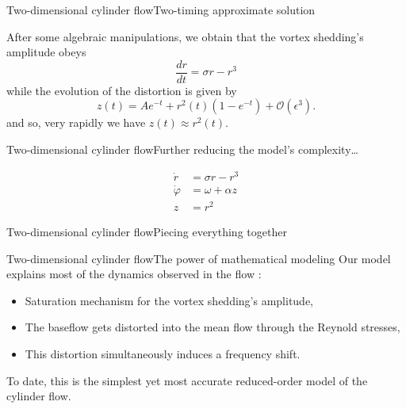 \documentclass[usenames,dvipsnames,svgnames,10pt,aspectratio=169]{beamer}
\begin{document}
\begin{frame}[t, c]{Two-dimensional cylinder flow}{Two-timing approximate solution}
  \begin{minipage}{.68\textwidth}
    After some algebraic manipulations, we obtain that the vortex shedding's amplitude obeys
    \[
    \dfrac{dr}{dt} = \sigma  r - r^3
    \]
    while the evolution of the distortion is given by
    \[
    z(t) = A e^{-t} + r^2(t) \left(1 - e^{-t}\right) + \mathcal{O}(\epsilon^3).
    \]
    and so, very rapidly we have $z(t) \approx r^2(t)$.
  \end{minipage}%
  \hfill
  \begin{minipage}{.28\textwidth}
  \end{minipage}
\end{frame}




\begin{frame}[t, c]{Two-dimensional cylinder flow}{Further reducing the model's complexity\ldots}
  \begin{minipage}{.48\textwidth}
    \[
    \begin{aligned}
      \dot{r} & = \sigma r - r^3 \\
    \dot{\varphi} & = \omega + \alpha z \\
    z & = r^2
    \end{aligned}
    \]
  \end{minipage}%
  \hfill
  \begin{minipage}{.48\textwidth}

  \end{minipage}
\end{frame}




\begin{frame}[t, c]{Two-dimensional cylinder flow}{Piecing everything together}

\end{frame}




\begin{frame}[t, c]{Two-dimensional cylinder flow}{The power of mathematical modeling}
  Our model explains most of the dynamics observed in the flow :
  
  \medskip
  
  \begin{itemize}
  \item Saturation mechanism for the vortex shedding's amplitude,
  \item The baseflow gets distorted into the mean flow through the Reynold stresses,
  \item This distortion simultaneously induces a frequency shift.
  \end{itemize}
  
  \medskip
  
  To date, this is the simplest yet most accurate reduced-order model of the cylinder flow.
\end{frame}
\end{document}
